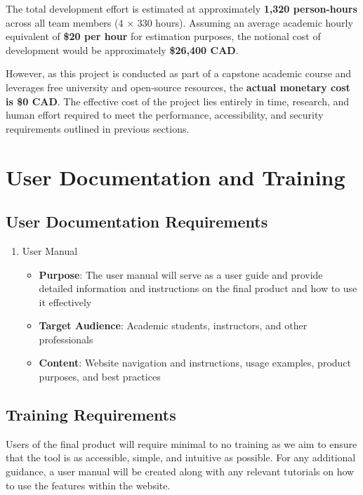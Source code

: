 \documentclass[12pt]{article}
\begin{document}
The total development effort is estimated at approximately \textbf{1,320 person-hours} across all team members (4 × 330 hours).  
Assuming an average academic hourly equivalent of \textbf{\$20 per hour} for estimation purposes, the notional cost of development would be approximately \textbf{\$26,400 CAD}.  

However, as this project is conducted as part of a capstone academic course and leverages free university and open-source resources, the \textbf{actual monetary cost is \$0 CAD}.  
The effective cost of the project lies entirely in time, research, and human effort required to meet the performance, accessibility, and security requirements outlined in previous sections.

\section{User Documentation and Training}
\subsection{User Documentation Requirements}
\begin{enumerate}
  \item User Manual
  \begin{itemize}
    \item \textbf{Purpose}: The user manual will serve as a user guide and provide detailed information and instructions on the final product and how to use it effectively
    \item \textbf{Target Audience}: Academic students, instructors, and other professionals
    \item \textbf{Content}: Website navigation and instructions, usage examples, product purposes, and best practices
  \end{itemize}
\end{enumerate}
\subsection{Training Requirements}
Users of the final product will require minimal to no training as we aim to ensure that the tool is as accessible, simple, and intuitive as possible. For any additional guidance,
a user manual will be created along with any relevant tutorials on how to use the features within the website. 
\end{document}

